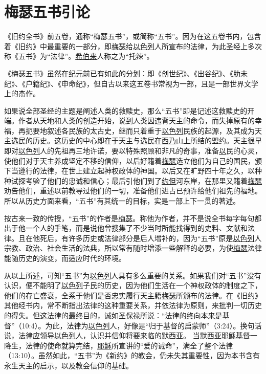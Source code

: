 \chapter{梅瑟五书引论}

《旧约全书》前五卷，通称“梅瑟五书”，或简称“五书”。因为在这五卷书内，包含着《旧约》中最重要的一部分，即\uline{梅瑟}给\uline{以色列}人所宣布的法律，为此圣经上多次称《五书》为“法律”。\uline{希伯来}人称之为“托辣”。

《梅瑟五书》虽然在纪元前已有如此的分划：即《创世纪》、《出谷纪》、《肋未纪》、《户籍纪》、《申命纪》，但自古以来这五卷书常视为一部，且是一部世界文学上的杰作。

如果说全部圣经的主题是阐述人类的救赎史，那么“五书”即是记述这救赎史的开端。作者从天地和人类的创造开始，说到人类因违背天主的命令，而失掉原有的幸福，再扼要地叙述各民族的太古史，继而只着重于\uline{以色列}民族的起源，及其成为天主选民的历史。这历史的中心即在于天主与选民在\uline{西乃}山上所结的盟约。天主很早即对\uline{以色列}人的先祖再三地许诺，要以特殊照顾和非凡的奇事，准备\uline{以}民的心灵，使他们对于天主养成坚定不移的信仰，以后好籍着\uline{梅瑟}选立他们为自己的国民，颁下当遵行的法律，在世上建立起神权政体的神国。以后又在旷野四十年之久，以种种试探考验了他们的忠诚和信心；最后引他们到了\uline{约但}河东岸，在那里又籍着\uline{梅瑟}劝告他们，重述以前教导过他们的一切，准备他们进占已预许给他们祖先的福地。所以从历史方面来看，“五书”有其统一的目标，实是一部上下一贯的著述。

按古来一致的传授，“五书”的作者是\uline{梅瑟}。称他为作者，并不是说全书每字每句都出于他一个人的手笔，而是说他曾搜集了不少当时所能找得到的史料、文献和法律。且在他死后，有许多历史或法律部分是后人增补的，因为“五书”原是\uline{以色列}人宗教、政治、社会生活的法典，所以常有随时增添一些解释的必要，为使\uline{梅瑟}法律能随历史的演变，而适应时代的环境。

从以上所述，可知“五书”为\uline{以色列}人具有多么重要的关系。如果我们对“五书”没有认识，便不能明了\uline{以色列}子民的历史，因为他们生活在一个神权政体的制度之下，他们的存亡盛衰，全系于他们是否忠实履行天主籍\uline{梅瑟}所颁布的法律。在《旧约》其他经书内，常不断指出法律的这种重要关系，并依法律为原则，来批判一切历史的得失。但这法律的最终目的，诚如圣\uline{保禄}所说：“法律的终向本来是基督”（10:4）。为此，法律为\uline{以色列}人，好像是“归于基督的启蒙师”（3:24）。换句话说，法律应领导\uline{以色列}人，认识并信仰将要来临的默西亚。
当默西亚\uline{耶稣}\uline{基督}一降生，法律的使命就算完结，\uline{耶稣}所宣讲的“爱的诫命”，满全了整个法律（13:10）。虽然如此，“五书”为《新约》的教会，仍未失其重要性，因为本书含有永生天主的启示，以及教会信仰的基础。
